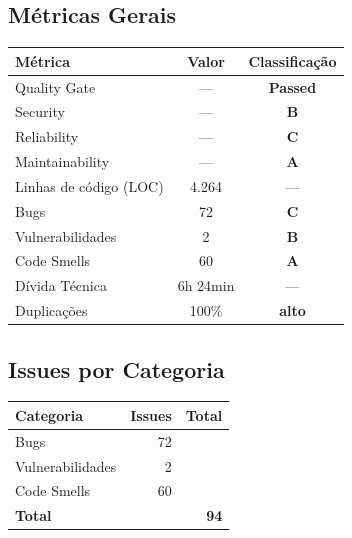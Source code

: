 \documentclass[12pt,a4paper]{article}
\begin{document}
\subsection{Métricas Gerais}

\begin{tabularx}{\textwidth}{Xcc}
    \toprule
    \textbf{Métrica} & \textbf{Valor} & \textbf{Classificação} \\
    \midrule
    Quality Gate         & ---       & \textcolor{sonargreen}{\bfseries Passed} \\
    Security             & ---       & \textcolor{sonarorange}{\bfseries B} \\
    Reliability          & ---       & \textcolor{sonarred}{\bfseries C} \\
    Maintainability      & ---       & \textcolor{sonargreen}{\bfseries A} \\
    Linhas de código (LOC) & 4.264   & --- \\
    Bugs                 & 72        & \textcolor{sonarred}{\bfseries C} \\
    Vulnerabilidades     & 2         & \textcolor{sonarorange}{\bfseries B} \\
    Code Smells          & 60        & \textcolor{sonargreen}{\bfseries A} \\
    Dívida Técnica       & 6h 24min  & --- \\
    Duplicações          & 100\%     & \textcolor{sonarred}{\bfseries alto} \\
    \bottomrule
\end{tabularx}

\subsection{Issues por Categoria}

\begin{tabular}{lrr}
    \toprule
    \textbf{Categoria}    & \textbf{Issues} & \textbf{Total} \\
    \midrule
    Bugs                  & 72              & \\
    Vulnerabilidades      & 2               & \\
    Code Smells           & 60              & \\
    \midrule
    \textbf{Total}        &                 & \textbf{94} \\
    \bottomrule
\end{tabular}

\end{document}
